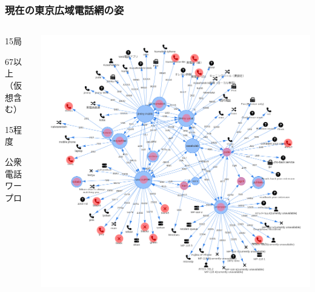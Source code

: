 \documentclass[
  lualatex,
  aspectratio=169,
  14pt
]{beamer}
\begin{document}
\begin{frame}
  \frametitle{現在の東京広域電話網の姿}

  \begin{columns}
    \begin{column}{.25\textwidth}
      \begin{description}[labelwidth=\linewidth]
        \item[交換局数]
          15局
        \item[端末数]
          67以上\\
          （仮想含む）
        \item[黒電話の数]
          15程度
        \item[その他]
          公衆電話\\
          ワープロ
      \end{description}
      ~
    \end{column}
    \begin{column}{.7\textwidth}
      \centering
      \includegraphics[height=\textheight]{./images/mantela2.png}
    \end{column}
  \end{columns}
\end{frame}
\end{document}

